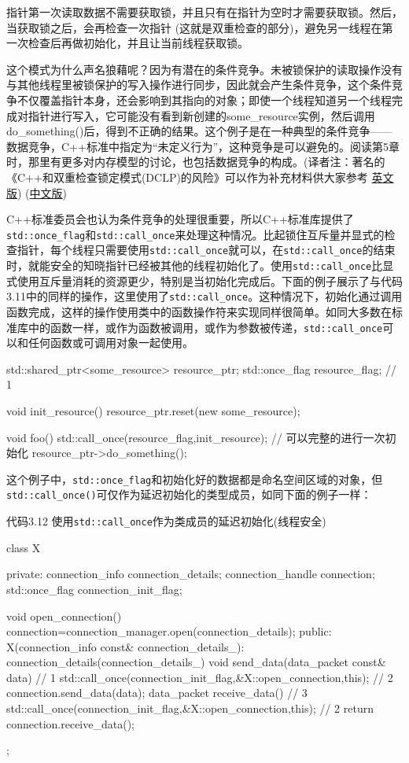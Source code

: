 指针第一次读取数据不需要获取锁，并且只有在指针为空时才需要获取锁。然后，当获取锁之后，会再检查一次指针 (这就是双重检查的部分)，避免另一线程在第一次检查后再做初始化，并且让当前线程获取锁。

这个模式为什么声名狼藉呢？因为有潜在的条件竞争。未被锁保护的读取操作没有与其他线程里被锁保护的写入操作进行同步，因此就会产生条件竞争，这个条件竞争不仅覆盖指针本身，还会影响到其指向的对象；即使一个线程知道另一个线程完成对指针进行写入，它可能没有看到新创建的some\_resource实例，然后调用do\_something()后，得到不正确的结果。这个例子是在一种典型的条件竞争——数据竞争，C++标准中指定为“未定义行为”，这种竞争是可以避免的。阅读第5章时，那里有更多对内存模型的讨论，也包括数据竞争的构成。(译者注：著名的《C++和双重检查锁定模式(DCLP)的风险》可以作为补充材料供大家参考 \href{https://www.aristeia.com/Papers/DDJ_Jul_Aug_2004_revised.pdf}{英文版}) (\href{http://blog.jobbole.com/86392/}{中文版})

C++标准委员会也认为条件竞争的处理很重要，所以C++标准库提供了\texttt{std::once\_flag}和\texttt{std::call\_once}来处理这种情况。比起锁住互斥量并显式的检查指针，每个线程只需要使用\texttt{std::call\_once}就可以，在\texttt{std::call\_once}的结束时，就能安全的知晓指针已经被其他的线程初始化了。使用\texttt{std::call\_once}比显式使用互斥量消耗的资源更少，特别是当初始化完成后。下面的例子展示了与代码3.11中的同样的操作，这里使用了\texttt{std::call\_once}。这种情况下，初始化通过调用函数完成，这样的操作使用类中的函数操作符来实现同样很简单。如同大多数在标准库中的函数一样，或作为函数被调用，或作为参数被传递，\texttt{std::call\_once}可以和任何函数或可调用对象一起使用。

\begin{cpp}
std::shared_ptr<some_resource> resource_ptr;
std::once_flag resource_flag;  // 1

void init_resource()
{
  resource_ptr.reset(new some_resource);
}

void foo()
{
  std::call_once(resource_flag,init_resource);  // 可以完整的进行一次初始化
  resource_ptr->do_something();
}
\end{cpp}

这个例子中，\texttt{std::once\_flag}和初始化好的数据都是命名空间区域的对象，但\texttt{std::call\_once()}可仅作为延迟初始化的类型成员，如同下面的例子一样：

代码3.12 使用\texttt{std::call\_once}作为类成员的延迟初始化(线程安全)

\begin{cpp}
class X
{
private:
  connection_info connection_details;
  connection_handle connection;
  std::once_flag connection_init_flag;

  void open_connection()
  {
    connection=connection_manager.open(connection_details);
  }
public:
  X(connection_info const& connection_details_):
      connection_details(connection_details_)
  {}
  void send_data(data_packet const& data)  // 1
  {
    std::call_once(connection_init_flag,&X::open_connection,this);  // 2
    connection.send_data(data);
  }
  data_packet receive_data()  // 3
  {
    std::call_once(connection_init_flag,&X::open_connection,this);  // 2
    return connection.receive_data();
  }
};
\end{cpp}

